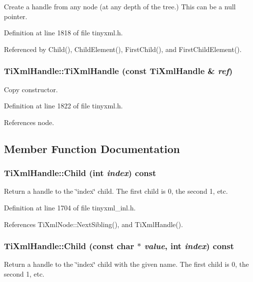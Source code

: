 Create a handle from any node (at any depth of the tree.) This can be a null pointer. 

Definition at line 1818 of file tinyxml.h.

Referenced by Child(), ChildElement(), FirstChild(), and FirstChildElement().\hypertarget{class_ti_xml_handle_a236d7855e1e56ccc7b980630c48c7fd7}{
\subsubsection[{TiXmlHandle}]{\setlength{\rightskip}{0pt plus 5cm}TiXmlHandle::TiXmlHandle (const {\bf TiXmlHandle} \& {\em ref})}}
\label{class_ti_xml_handle_a236d7855e1e56ccc7b980630c48c7fd7}


Copy constructor. 

Definition at line 1822 of file tinyxml.h.

References node.

\subsection{Member Function Documentation}
\hypertarget{class_ti_xml_handle_af9cf6a7d08a5da94a8924425ad0cd5ac}{
\subsubsection[{Child}]{ TiXmlHandle::Child (int {\em index}) const}}
\label{class_ti_xml_handle_af9cf6a7d08a5da94a8924425ad0cd5ac}
Return a handle to the \char`\"{}index\char`\"{} child. The first child is 0, the second 1, etc. 

Definition at line 1704 of file tinyxml\_\-inl.h.

References TiXmlNode::NextSibling(), and TiXmlHandle().\hypertarget{class_ti_xml_handle_a072492b4be1acdb0db2d03cd8f71ccc4}{
\subsubsection[{Child}]{ TiXmlHandle::Child (const char $\ast$ {\em value}, \/  int {\em index}) const}}
\label{class_ti_xml_handle_a072492b4be1acdb0db2d03cd8f71ccc4}
Return a handle to the \char`\"{}index\char`\"{} child with the given name. The first child is 0, the second 1, etc. 

